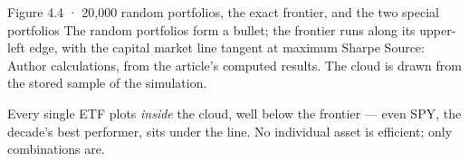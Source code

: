 \documentclass{pyportfolios-note}
\begin{document}
  {Figure 4.4 · 20,000 random portfolios, the exact frontier, and the two special portfolios}
  {The random portfolios form a bullet; the frontier runs along its upper-left
   edge, with the capital market line tangent at maximum Sharpe}
  {Source: Author calculations, from the article's computed results. The cloud is
   drawn from the stored sample of the simulation.}

Every single ETF plots \textit{inside} the cloud, well below the frontier — even
SPY, the decade's best performer, sits under the line. No individual asset is
efficient; only combinations are.

\noteneedroom{330bp}
\end{document}
